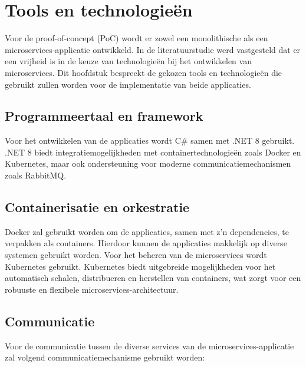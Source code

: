 \section{Tools en technologieën}
\label{tools_en_technologieën}

Voor de proof-of-concept (PoC) wordt er zowel een monolithische als een microservices-applicatie ontwikkeld. In de literatuurstudie werd vastgesteld dat er een vrijheid is in de keuze van technologieën bij het ontwikkelen van microservices. Dit hoofdstuk bespreekt de gekozen tools en technologieën die gebruikt zullen worden voor de implementatie van beide applicaties.

\subsection{Programmeertaal en framework}

Voor het ontwikkelen van de applicaties wordt C\# samen met .NET 8 gebruikt. .NET 8 biedt integratiemogelijkheden met containertechnologieën zoals Docker en Kubernetes, maar ook ondersteuning voor moderne communicatiemechanismen zoals RabbitMQ.

\subsection{Containerisatie en orkestratie}
\label{containerisatie_orkestratie}

Docker zal gebruikt worden om de applicaties, samen met z'n dependencies, te verpakken als containers. Hierdoor kunnen de applicaties makkelijk op diverse systemen gebruikt worden. Voor het beheren van de microservices wordt Kubernetes gebruikt. Kubernetes biedt uitgebreide mogelijkheden voor het automatisch schalen, distribueren en herstellen van containers, wat zorgt voor een robuuste en flexibele microservices-architectuur.

\subsection{Communicatie}

Voor de communicatie tussen de diverse services van de microservices-applicatie zal volgend communicatiemechanisme gebruikt worden:

